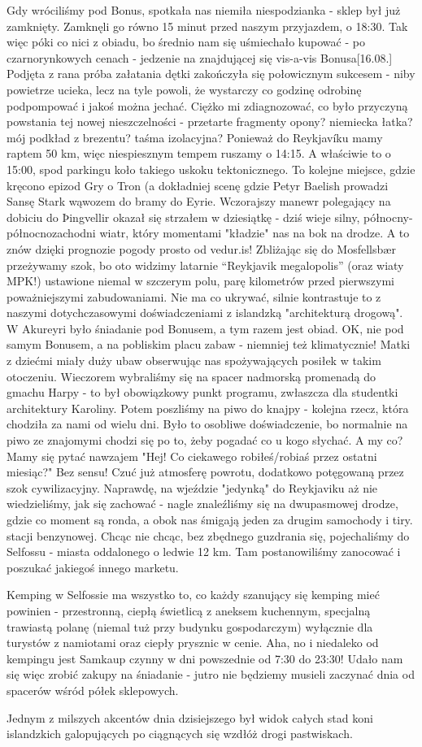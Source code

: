 Gdy wróciliśmy pod Bonus, spotkała nas niemiła niespodzianka - sklep był już zamknięty. Zamknęli go równo 15 minut przed naszym przyjazdem, o 18:30. Tak więc póki co nici z obiadu, bo średnio nam się uśmiechało kupować - po czarnorynkowych cenach - jedzenie na znajdującej się vis-a-vis Bonusa[16.08.]
Podjęta z rana próba załatania dętki zakończyła się połowicznym sukcesem - niby powietrze ucieka, lecz na tyle powoli, że wystarczy co godzinę odrobinę podpompować i jakoś można jechać. Ciężko mi zdiagnozować, co było przyczyną powstania tej nowej nieszczelności - przetarte fragmenty opony? niemiecka łatka? mój podkład z brezentu? taśma izolacyjna?
Ponieważ do Reykjavíku mamy raptem 50 km, więc niespiesznym tempem ruszamy o 14:15. A właściwie to o 15:00, spod parkingu koło takiego uskoku tektonicznego. To kolejne miejsce, gdzie kręcono epizod Gry o Tron (a dokładniej scenę gdzie Petyr Baelish prowadzi Sansę Stark wąwozem do bramy do Eyrie.
Wczorajszy manewr polegający na dobiciu do Þingvellir okazał się strzałem w dziesiątkę - dziś wieje silny, północny-północnozachodni wiatr, który momentami "kładzie" nas na bok na drodze. A to znów dzięki prognozie pogody prosto od vedur.is!
Zbliżając się do Mosfellsbær przeżywamy szok, bo oto widzimy latarnie “Reykjavik megalopolis” (oraz wiaty MPK!) ustawione niemal w szczerym polu, parę kilometrów przed pierwszymi poważniejszymi zabudowaniami. Nie ma co ukrywać, silnie kontrastuje to z naszymi dotychczasowymi doświadczeniami z islandzką "architekturą drogową".
W Akureyri było śniadanie pod Bonusem, a tym razem jest obiad. OK, nie pod samym Bonusem, a na pobliskim placu zabaw - niemniej też klimatycznie! Matki z dziećmi miały duży ubaw obserwując nas spożywających posiłek w takim otoczeniu.
Wieczorem wybraliśmy się na spacer nadmorską promenadą do gmachu Harpy - to był obowiązkowy punkt programu, zwłaszcza dla studentki architektury Karoliny. Potem poszliśmy na piwo do knajpy - kolejna rzecz, która chodziła za nami od wielu dni. Było to osobliwe doświadczenie, bo normalnie na piwo ze znajomymi chodzi się po to, żeby pogadać co u kogo słychać. A my co? Mamy się pytać nawzajem "Hej! Co ciekawego robiłeś/robiaś przez ostatni miesiąc?" Bez sensu!
Czuć już atmosferę powrotu, dodatkowo potęgowaną przez szok cywilizacyjny. Naprawdę, na wjeździe "jedynką" do Reykjaviku aż nie wiedzieliśmy, jak się zachować - nagle znaleźliśmy się na dwupasmowej drodze, gdzie co moment są ronda, a obok nas śmigają jeden za drugim samochody i tiry. stacji benzynowej. Chcąc nie chcąc, bez zbędnego guzdrania się, pojechaliśmy do Selfossu - miasta oddalonego o ledwie 12 km. Tam postanowiliśmy zanocować i poszukać jakiegoś innego marketu.

Kemping w Selfossie ma wszystko to, co każdy szanujący się kemping mieć powinien - przestronną, ciepłą świetlicą z aneksem kuchennym, specjalną trawiastą polanę (niemal tuż przy budynku gospodarczym) wyłącznie dla turystów z namiotami oraz ciepły prysznic w cenie. Aha, no i niedaleko od kempingu jest Samkaup czynny w dni powszednie od 7:30 do 23:30! Udało nam się więc zrobić zakupy na śniadanie - jutro nie będziemy musieli zaczynać dnia od spacerów wśród półek sklepowych.

Jednym z milszych akcentów dnia dzisiejszego był widok całych stad koni islandzkich galopujących po ciągnących się wzdłóż drogi pastwiskach.